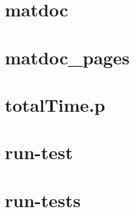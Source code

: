 \section{matdoc}
\label{matdoc}


\section{matdoc\_pages}
\label{matdocpages}


\section{totalTime.p}
\label{totaltime}


\section{run-test}
\label{runtest}


\section{run-tests}
\label{runtests}




